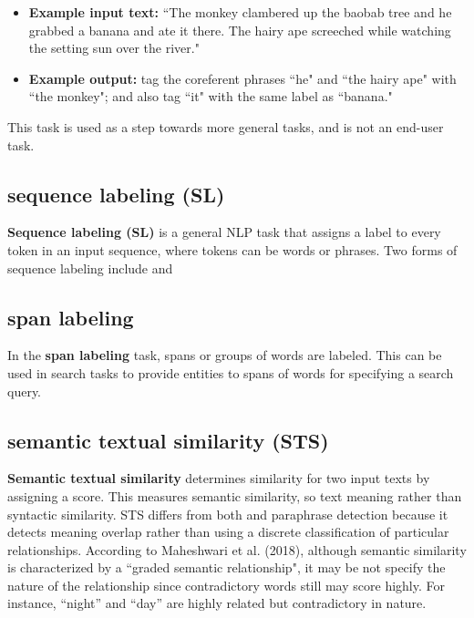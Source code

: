 \begin{itemize}
    \item \textbf{Example input text: } ``The monkey clambered up the baobab tree and he grabbed a banana and ate it there. The hairy ape screeched while watching the setting sun over the river."
    
    \item \textbf{Example output: } tag the coreferent phrases ``he" and ``the hairy ape" with  ``the monkey"; and also tag ``it" with the same label as ``banana." 
    
\end{itemize}

This task is used as a step towards more general tasks, and is not an end-user task. 

\subsection{sequence labeling (SL)} \label{nlptask:sequencelabelingSL}

\textbf{Sequence labeling (SL)} is a general NLP task that assigns a label to every token in an input sequence, where tokens can be words or phrases. Two forms of sequence labeling include  and 

\subsection{span labeling} \label{nlptask:spanlabeling}

In the \textbf{span labeling} task, spans or groups of words are labeled. This can be used in search tasks to provide entities to spans of words for specifying a search query. 

\subsection{semantic textual similarity (STS)} \label{nlptask:semantictextualsimilaritySTS}

\textbf{Semantic textual similarity} determines similarity for two input texts by assigning a score. This measures semantic similarity, so text meaning rather than syntactic similarity. STS differs from both  and paraphrase detection because it detects meaning overlap rather than using a discrete classification of particular relationships. According to Maheshwari et al. (2018), although semantic similarity is characterized by a ``graded semantic relationship", it may be not specify the nature of the relationship since contradictory words still may score highly. For instance, ``night” and ``day” are highly related but contradictory in nature. 



